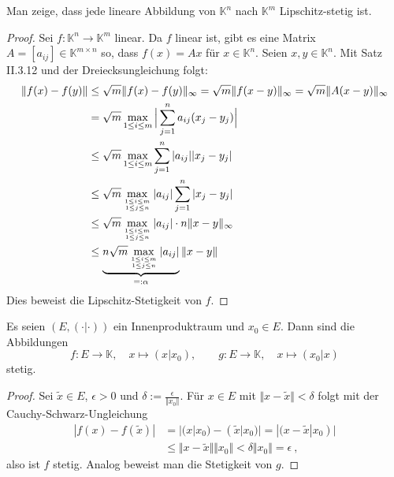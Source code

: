 
\begin{aufgabe}
	Man zeige, dass jede lineare Abbildung von $\mathbb K^n$ nach $\mathbb K^m$
	Lipschitz-stetig ist.
\end{aufgabe}
\begin{proof}
	Sei $f: \mathbb K^n \to \mathbb K^m$ linear. Da $f$ linear ist, gibt es eine
	Matrix $A = [a_{ij}] \in \mathbb K^{m \times n}$ so, dass $f(x) = A x$ für $x \in \mathbb K^n$.
	Seien $x, y \in \mathbb K^n$. Mit Satz II.3.12 und der Dreiecksungleichung folgt:
	\begin{align*}
		\Vert f(x) - f(y) \Vert
			&\leq \sqrt m \Vert f(x) - f(y) \Vert_\infty
			= \sqrt m \Vert f(x-y) \Vert_\infty 
			= \sqrt m \Vert A(x-y) \Vert_\infty \\
			&= \sqrt m \max_{1 \leq i \leq m} \Big \vert \sum_{j=1}^n a_{ij} (x_j - y_j) \Big \vert \\
			&\leq \sqrt m \max_{1 \leq i \leq m} \sum_{j=1}^n |a_{ij}| | x_j - y_j | \\
			&\leq \sqrt m \max_{1 \leq i \leq m \atop 1 \leq j \leq n} | a_{ij}| \sum_{j=1}^n |x_j - y_j| \\
			&\leq \sqrt m \max_{1 \leq i \leq m \atop 1 \leq j \leq n} |a_{ij}|\cdot  n \Vert x - y \Vert_\infty \\
			&\leq \underbrace{n \sqrt m \max_{1 \leq i \leq m \atop 1 \leq j \leq n} |a_{ij}| }_{=: \alpha} \Vert x -y \Vert
	\end{align*}
	Dies beweist die Lipschitz-Stetigkeit von $f$.
\end{proof}

\begin{aufgabe}
	Es seien $(E, (\cdot | \cdot) )$ ein Innenproduktraum und $x_0 \in E$. Dann sind die Abbildungen
	\[
		f: E \to \mathbb K, \quad x \mapsto (x | x_0), \qquad
		g: E \to \mathbb K, \quad x \mapsto (x_0 | x)
	\]
	stetig.
\end{aufgabe}
\begin{proof}
	Sei $\tilde x \in E$, $\epsilon > 0$ und $\delta := \frac{\epsilon}{\Vert x_0 \Vert}$. Für
	$x \in E$ mit $\Vert x - \tilde x \Vert < \delta$ folgt mit der Cauchy-Schwarz-Ungleichung
	\begin{align*}
		| f(x) - f(\tilde x) | 
			&= | (x | x_0) - (\tilde x | x_0) |
			= |(x-\tilde x | x_0) | \\
			&\leq \Vert x - \tilde x \Vert \Vert x_0 \Vert < \delta \Vert x_0 \Vert = \epsilon \ ,
	\end{align*}
	also ist $f$ stetig.
	Analog beweist man die Stetigkeit von $g$.
\end{proof}

